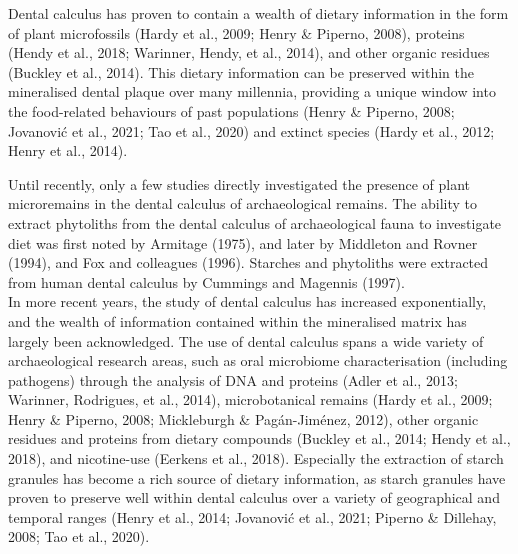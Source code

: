 \documentclass[
]{article}
\begin{document}
Dental calculus has proven to contain a wealth of
dietary information in the form of plant microfossils
(Hardy et al., 2009; Henry \& Piperno, 2008),
proteins (Hendy et al., 2018; Warinner, Hendy, et al., 2014),
and other organic residues (Buckley et al., 2014).
This dietary information can be preserved within the mineralised dental plaque
over many millennia, providing a unique window into the food-related behaviours of
past populations
(Henry \& Piperno, 2008; Jovanović et al., 2021; Tao et al., 2020)
and extinct species (Hardy et al., 2012; Henry et al., 2014).

Until recently, only a few studies directly investigated the presence of plant
microremains
in the dental calculus of archaeological remains. The ability to extract phytoliths
from the dental calculus of archaeological fauna to investigate diet was first
noted by Armitage (1975),
and later by Middleton and Rovner (1994),
and Fox and colleagues (1996). Starches and phytoliths were
extracted from human dental calculus by Cummings and Magennis (1997).\\
In more recent years, the study of dental calculus has increased exponentially,
and the wealth of information contained within the mineralised matrix has largely
been acknowledged. The use of dental calculus spans a wide
variety of archaeological research areas, such as oral microbiome
characterisation (including pathogens) through the analysis of DNA and proteins
(Adler et al., 2013; Warinner, Rodrigues, et al., 2014),
microbotanical remains (Hardy et al., 2009; Henry \& Piperno, 2008; Mickleburgh \& Pagán-Jiménez, 2012),
other organic residues and proteins from dietary compounds
(Buckley et al., 2014; Hendy et al., 2018),
and nicotine-use (Eerkens et al., 2018). Especially the extraction
of starch granules has become a rich source of dietary
information, as starch granules have proven to preserve well within dental calculus
over a variety of geographical and temporal ranges
(Henry et al., 2014; Jovanović et al., 2021; Piperno \& Dillehay, 2008; Tao et al., 2020).
\end{document}
